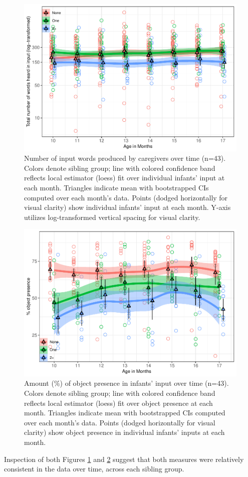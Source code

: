 \documentclass[
  man,mask,floatsintext]{apa6}
\begin{document}
\begin{figure}
\centering
\includegraphics{SiblingsStudy_SupplementaryData-anon-revisions_files/figure-latex/Figure-input-age-1.pdf}
\caption{\label{fig:Figure-input-age}Number of input words produced by caregivers over time (n=43). Colors denote sibling group; line with colored confidence band reflects local estimator (loess) fit over individual infants' input at each month. Triangles indicate mean with bootstrapped CIs computed over each month's data. Points (dodged horizontally for visual clarity) show individual infants' input at each month. Y-axis utilizes log-transformed vertical spacing for visual clarity.}
\end{figure}

\begin{figure}
\centering
\includegraphics{SiblingsStudy_SupplementaryData-anon-revisions_files/figure-latex/Figure-OP-age-1.pdf}
\caption{\label{fig:Figure-OP-age}Amount (\%) of object presence in infants' input over time (n=43). Colors denote sibling group; line with colored confidence band reflects local estimator (loess) fit over object presence at each month. Triangles indicate mean with bootstrapped CIs computed over each month's data. Points (dodged horizontally for visual clarity) show object presence in individual infants' inputs at each month.}
\end{figure}

Inspection of both Figures \ref{fig:Figure-input-age} and \ref{fig:Figure-OP-age} suggest that both measures were relatively consistent in the data over time, across each sibling group.
\end{document}
